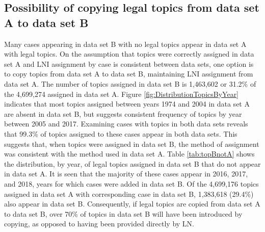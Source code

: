 \documentclass[10pt, letterpaper]{article}
\begin{document}
\begin{spacing}{1.0}

\clearpage

\subsection{Possibility of copying legal topics from data set A to data set B}

Many cases appearing in data set B with no legal topics appear in data set A with legal topics.  On the assumption that topics were correctly assigned in data set A and LNI assignment by case is consistent between data sets, one option is to copy topics from data set A to data set B, maintaining LNI assignment from data set A.  The number of topics assigned in data set B is 1,463,602 or 31.2\% of the 4,699,274 assigned in data set A.  Figure \ref{fig:DistributionTopicsByYear} indicates that most topics assigned between years 1974 and 2004 in data set A are absent in data set B, but suggests consistent frequency of topics by year between 2005 and 2017.  Examining cases with topics in both data sets reveals that 99.3\% of topics assigned to these cases appear in both data sets.  This suggests that, when topics were assigned in data set B, the method of assignment was consistent with the method used in data set A.  Table \ref{tab:topBnotA} shows the distribution, by year, of legal topics assigned in data set B that do not appear in data set A.  It is seen that the majority of these cases appear in 2016, 2017, and 2018, years for which cases were added in data set B.  Of the 4,699,176 topics assigned in data set A with corresponding case in data set B, 1,383,618 (29.4\%) also appear in data set B.  Consequently, if legal topics are copied from data set A to data set B, over 70\% of topics in data set B will have been introduced by copying, as opposed to having been provided directly by LN.

\vspace{0.25in}


\end{spacing}
\end{document}
